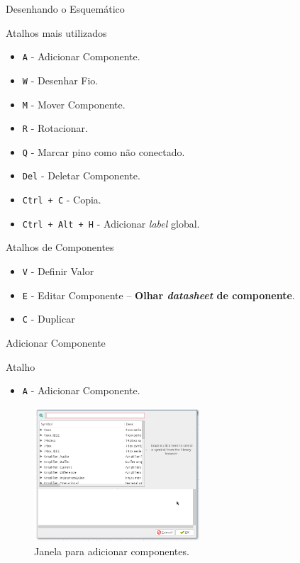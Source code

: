 \documentclass{beamer}
\begin{document}
\begin{frame}{Desenhando o Esquemático}
	\begin{block}{Atalhos mais utilizados}
		\begin{itemize}
			\item \texttt{A} - Adicionar Componente.
			\item \texttt{W} - Desenhar Fio.
			\item \texttt{M} - Mover Componente.
			\item \texttt{R} - Rotacionar.
			\item \texttt{Q} - Marcar pino como não conectado.
			\item \texttt{Del} - Deletar Componente.
			\item \texttt{Ctrl + C} - Copia.
			\item \texttt{Ctrl + Alt + H} - Adicionar \textit{label} global.
		\end{itemize}
	\end{block}
	\pause
	\begin{block}{Atalhos de Componentes}
		\begin{itemize}
			\item \texttt{V} - Definir Valor
			\item \texttt{E} - Editar Componente -- \textbf{Olhar \textit{datasheet} de componente}.
			\item \texttt{C} - Duplicar
		\end{itemize}
	\end{block}
\end{frame}

\begin{frame}{Adicionar Componente}
	\begin{block}{Atalho}
		\begin{itemize}
			\item \texttt{A} - Adicionar Componente.
		\end{itemize}
	\end{block}
	\begin{figure}
		\centering
		\includegraphics[width=0.55\textwidth]{Imagens/01_adicionar_componente.png}
		\caption{Janela para adicionar componentes.}
	\end{figure}
\end{frame}
\end{document}
